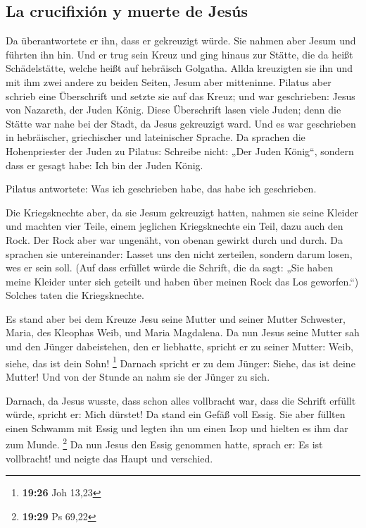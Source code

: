 \hypertarget{la-crucifixiuxf3n-y-muerte-de-jesuxfas}{%
\subsection{La crucifixión y muerte de
Jesús}\label{la-crucifixiuxf3n-y-muerte-de-jesuxfas}}

 Da überantwortete er ihn, dass er gekreuzigt würde. Sie
nahmen aber Jesum und führten ihn hin.  Und er trug sein
Kreuz und ging hinaus zur Stätte, die da heißt Schädelstätte, welche
heißt auf hebräisch Golgatha.  Allda kreuzigten sie ihn
und mit ihm zwei andere zu beiden Seiten, Jesum aber mitteninne.
 Pilatus aber schrieb eine Überschrift und setzte sie auf
das Kreuz; und war geschrieben: Jesus von Nazareth, der Juden König.
 Diese Überschrift lasen viele Juden; denn die Stätte war
nahe bei der Stadt, da Jesus gekreuzigt ward. Und es war geschrieben in
hebräischer, griechischer und lateinischer Sprache.  Da
sprachen die Hohenpriester der Juden zu Pilatus: Schreibe nicht: „Der
Juden König``, sondern dass er gesagt habe: Ich bin der Juden König.

 Pilatus antwortete: Was ich geschrieben habe, das habe
ich geschrieben.

 Die Kriegsknechte aber, da sie Jesum gekreuzigt hatten,
nahmen sie seine Kleider und machten vier Teile, einem jeglichen
Kriegsknechte ein Teil, dazu auch den Rock. Der Rock aber war ungenäht,
von obenan gewirkt durch und durch.  Da sprachen sie
untereinander: Lasset uns den nicht zerteilen, sondern darum losen, wes
er sein soll. (Auf dass erfüllet würde die Schrift, die da sagt: „Sie
haben meine Kleider unter sich geteilt und haben über meinen Rock das
Los geworfen.``) Solches taten die Kriegsknechte.

 Es stand aber bei dem Kreuze Jesu seine Mutter und
seiner Mutter Schwester, Maria, des Kleophas Weib, und Maria Magdalena.
 Da nun Jesus seine Mutter sah und den Jünger
dabeistehen, den er liebhatte, spricht er zu seiner Mutter: Weib, siehe,
das ist dein Sohn! \footnote{\textbf{19:26} Joh 13,23} 
Darnach spricht er zu dem Jünger: Siehe, das ist deine Mutter! Und von
der Stunde an nahm sie der Jünger zu sich.

 Darnach, da Jesus wusste, dass schon alles vollbracht
war, dass die Schrift erfüllt würde, spricht er: Mich dürstet!
 Da stand ein Gefäß voll Essig. Sie aber füllten einen
Schwamm mit Essig und legten ihn um einen Isop und hielten es ihm dar
zum Munde. \footnote{\textbf{19:29} Ps 69,22}  Da nun
Jesus den Essig genommen hatte, sprach er: Es ist vollbracht! und neigte
das Haupt und verschied.

